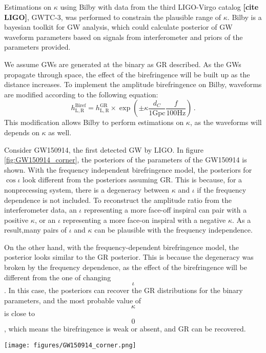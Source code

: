 \documentclass[twocolumn]{aastex631}
\begin{document}
Estimations on $\kappa$ using Bilby with data from the third LIGO-Virgo catalog \textbf{[cite LIGO]}, GWTC-3,
was performed to constrain the plausible range of $\kappa$.
Bilby is a bayesian toolkit for GW analysis, which could calculate posterior of GW waveform parameters based on signals from
interferometer and priors of the parameters provided. \citep{Ashton_2019}

We assume GWs are generated at the binary as GR described. As the GWs propagate through space,
the effect of the birefringence will be built up as the distance increases.
To implement the amplitude birefringence on Bilby, waveforms are modified according to the following equation:
\begin{equation}
    h_\mathrm{L,R}^{\mathrm{Biref}}=
    h_\mathrm{L,R}^{\mathrm{GR}}\times
    \exp\left(\pm\kappa\frac{d_C}{1\mathrm{ Gpc}}\frac{f}{100\mathrm{ Hz}}\right)\,.
\end{equation}
This modification allows Bilby to perform estimations on $\kappa$, as the waveforms will depends on $\kappa$ as well.

Consider GW150914, the first detected GW by LIGO. In figure \ref{fig:GW150914_corner}, the posteriors of the parameters of the GW150914 is shown.
With the frequency independent birefringence model, the posteriors for $\cos\iota$ look different from the posteriors assuming GR.
This is because, for a nonprecessing system, there is a degeneracy between $\kappa$ and $\iota$ if the frequency dependence is not included.
To reconstruct the amplitude ratio from the interferometer data, an $\iota$ representing a more face-off inspiral can pair with a positive $\kappa$,
or an $\iota$ representing a more face-on inspiral with a negative $\kappa$.
As a result,many pairs of $\iota$ and $\kappa$ can be plausible with the frequency independence.

On the other hand, with the frequency-dependent birefringence model, the posterior looks similar to the GR posterior.
This is because the degeneracy was broken by the frequency dependence, as the effect of the birefringence will be different from the one of changing $$\iota$$.
In this case, the posteriors can recover the GR distributions for the binary parameters,
and the most probable value of $$\kappa$$ is close to $$0$$, which means the birefringence is weak or absent, and GR can be recovered.

\begin{figure*}[h]
    \texttt{[image: figures/GW150914\_corner.png]}
    \caption{The posterior of $\kappa$, luminosity distance $d_L$ and $\cos{\iota}$ for GW150914.
    The three sets of plots are the parameter estimations (PEs) done by LIGO with GR \citep{LIGO_2021},
    the PE done by us with the frequency independent birefringence and the frequency dependent birefringence respectively.
    Note that there is no posterior of $\kappa$ for the PE from LIGO, as the LIGO PE is based on GR,
    which does not suggest GW amplitude birefringence.}
    \label{fig:GW150914_corner}
\end{figure*}
\end{document}
